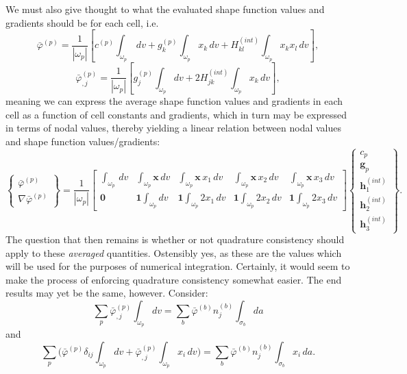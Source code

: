 \documentclass[11pt]{article} %
\begin{document}
We must also give thought to what the evaluated shape function values and gradients should be for each cell, i.e.
\begin{equation}
	\bar{\varphi}^{(p)} = \frac{1}{| \omega_p |} \left[ c^{(p)} \int_{\omega_p} \, dv + g^{(p)}_k \int_{\omega_p} x_k \, dv + H^{(int)}_{kl} \int_{\omega_p} x_k x_l \, dv \right] ,
\end{equation}
\begin{equation}
	\bar{\varphi}^{(p)}_{,j} = \frac{1}{| \omega_p |} \left[ g^{(p)}_j \int_{\omega_p} dv + 2 H^{(int)}_{jk} \int_{\omega_p} x_k \, dv \right] ,
\end{equation}
meaning we can express the average shape function values and gradients in each cell as a function of cell constants and gradients, which in turn may be expressed in terms of nodal values, thereby yielding a linear relation between nodal values and shape function values/gradients:
\begin{equation}
	\left\{ \begin{array}{c} \bar{\varphi}^{(p)} \\ \nabla \bar{\varphi}^{(p)} \end{array} \right\} = \frac{1}{| \omega_p |} \left[ \begin{array}{ccccc} \int_{\omega_p} \, dv & \int_{\omega_p} \mathbf{x} \, dv & \int_{\omega_p} \mathbf{x} \, x_1 \, dv & \int_{\omega_p} \mathbf{x} \, x_2 \, dv & \int_{\omega_p} \mathbf{x} \, x_3 \, dv \\ \mathbf{0} & \mathbf{1} \int_{\omega_p} dv & \mathbf{1} \int_{\omega_p} 2 x_1 \, dv & \mathbf{1} \int_{\omega_p} 2 x_2 \, dv & \mathbf{1} \int_{\omega_p} 2 x_3 \, dv \end{array} \right] \left\{ \begin{array}{c} c_p \\ \mathbf{g}_p \\ \mathbf{h}^{(int)}_{1} \\ \mathbf{h}^{(int)}_{2} \\ \mathbf{h}^{(int)}_{3} \end{array} \right\} .
\end{equation}
The question that then remains is whether or not quadrature consistency should apply to these \textit{averaged} quantities. Ostensibly yes, as these are the values which will be used for the purposes of numerical integration. Certainly, it would seem to make the process of enforcing quadrature consistency somewhat easier. The end results may yet be the same, however. Consider:
\begin{equation}
	\sum_p \bar{\varphi}^{(p)}_{,j} \int_{\omega_p} dv = \sum_{b} \bar{\varphi}^{(b)} n^{(b)}_j \int_{\sigma_b} da
\end{equation}
and
\begin{equation}
	\sum_p \bigg( \bar{\varphi}^{(p)} \delta_{ij} \int_{\omega_p} dv + \bar{\varphi}^{(p)}_{,j} \int_{\omega_p} x_i \, dv \bigg) = \sum_{b} \bar{\varphi}^{(b)} n^{(b)}_j \int_{\sigma_b} x_i \, da .
\end{equation}
\end{document}

